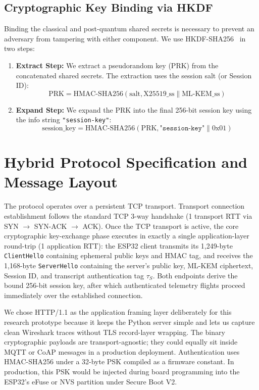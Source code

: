 \documentclass[journal, 10pt]{IEEEtran}
\begin{document}
\subsection{Cryptographic Key Binding via HKDF}
Binding the classical and post-quantum shared secrets is necessary to prevent an adversary from tampering with either component. We use HKDF-SHA256~\cite{b20,b33,b36} in two steps:
\begin{enumerate}
    \item \textbf{Extract Step:} We extract a pseudorandom key (PRK) from the concatenated shared secrets. The extraction uses the session salt (or Session ID):
    \begin{equation}
    \text{PRK} = \text{HMAC-SHA256}(\text{salt}, \text{X25519\_ss} \parallel \text{ML-KEM\_ss})
    \end{equation}
    \item \textbf{Expand Step:} We expand the PRK into the final 256-bit session key using the info string \texttt{"session-key"}:
    \begin{equation}
    \text{session\_key} = \text{HMAC-SHA256}(\text{PRK}, \texttt{"session-key"} \parallel \text{0x01})
    \end{equation}
\end{enumerate}

\section{Hybrid Protocol Specification and Message Layout}
The protocol operates over a persistent TCP transport. Transport connection establishment follows the standard TCP 3-way handshake (1 transport RTT via SYN $\to$ SYN-ACK $\to$ ACK). Once the TCP transport is active, the core cryptographic key-exchange phase executes in exactly a single application-layer round-trip (1 application RTT): the ESP32 client transmits its 1,249-byte \texttt{ClientHello} containing ephemeral public keys and HMAC tag, and receives the 1,168-byte \texttt{ServerHello} containing the server's public key, ML-KEM ciphertext, Session ID, and transcript authentication tag $\tau_S$. Both endpoints derive the bound 256-bit session key, after which authenticated telemetry flights proceed immediately over the established connection.

We chose HTTP/1.1 as the application framing layer deliberately for this research prototype because it keeps the Python server simple and lets us capture clean Wireshark traces without TLS record-layer wrapping. The binary cryptographic payloads are transport-agnostic; they could equally sit inside MQTT or CoAP messages in a production deployment. Authentication uses HMAC-SHA256 under a 32-byte PSK compiled as a firmware constant. In production, this PSK would be injected during board programming into the ESP32's eFuse or NVS partition under Secure Boot V2.
\end{document}
